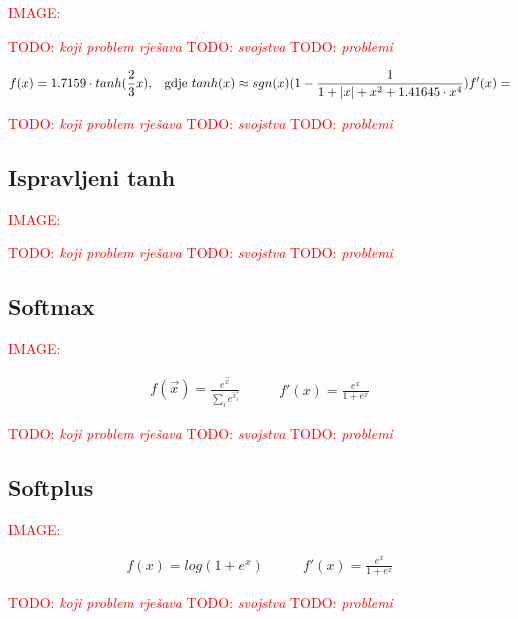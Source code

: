 \documentclass[times, utf8, diplomski]{fer}
\def\TODO#1{\noindent\textcolor{red}{TODO: \textit{#1}}\newline}
\def\todo#1{\TODO{#1}}
\def\todoimg#1{\begin{center} \textcolor{red}{IMAGE: \textit{#1}} \end{center}}
\begin{document}
\todoimg{}

\todo{koji problem rješava}
\todo{svojstva}
\todo{problemi}

\begin{equation}
f(x) = 1.7159 \cdot tanh(\frac{2}{3}x)\text{,\quad gdje }
tanh(x) \approx sgn(x)(1 - \frac{1}{1 + |x| + x^2 + 1.41645 \cdot x^4}) \\
f'(x) =
\end{equation}

\todo{koji problem rješava}
\todo{svojstva}
\todo{problemi}

\subsection*{Ispravljeni tanh}

\todoimg{}

\todo{koji problem rješava}
\todo{svojstva}
\todo{problemi}

\subsection*{Softmax}

\todoimg{}

\begin{equation}
\begin{split}
f(\vec{x}) = \frac{e^{\vec{x}}}{\sum_ie^{\vec{x_i}}}
\end{split}
\qquad
\begin{split}
f'(x) = \frac{e^x}{1+e^x}
\end{split}
\end{equation}

\todo{koji problem rješava}
\todo{svojstva}
\todo{problemi}

\subsection*{Softplus}

\todoimg{}

\begin{equation}
\begin{split}
f(x) = log(1+e^x)
\end{split}
\qquad
\begin{split}
f'(x) = \frac{e^x}{1+e^x}
\end{split}
\end{equation}

\todo{koji problem rješava}
\todo{svojstva}
\todo{problemi}
\end{document}

